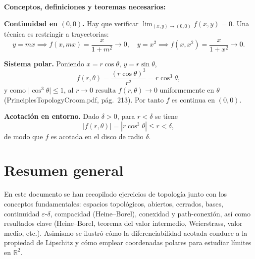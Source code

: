 \documentclass[a4paper,11pt]{article}  %
\begin{document}
\medskip
\textbf{Conceptos, definiciones y teoremas necesarios:}

\textbf{Continuidad en \((0,0)\).}  
Hay que verificar
\(\lim_{(x,y)\to(0,0)}f(x,y)=0\). Una técnica es restringir a trayectorias:
\[
y=mx\implies f(x,mx)=\frac{x}{1+m^2}\to0,\quad
y=x^2\implies f(x,x^2)=\frac{x}{1+x^2}\to0.
\]

\textbf{Sistema polar.}  
Poniendo \(x=r\cos\theta\), \(y=r\sin\theta\),
\[
f(r,\theta)
=\frac{(r\cos\theta)^3}{r^2}
=r\cos^3\theta,
\]
y como \(\lvert\cos^3\theta\rvert\le1\), al \(r\to0\) resulta \(f(r,\theta)\to0\) uniformemente en \(\theta\) (PrinciplesTopologyCroom.pdf, pág.\ 213). Por tanto \(f\) es continua en \((0,0)\).

\textbf{Acotación en entorno.}  
Dado \(\delta>0\), para \(r<\delta\) se tiene
\[
|f(r,\theta)|=|r\cos^3\theta|\le r<\delta,
\]
de modo que \(f\) es acotada en el disco de radio \(\delta\).

\bigskip

\section*{Resumen general}
En este documento se han recopilado ejercicios de topología junto con los conceptos fundamentales: espacios topológicos, abiertos, cerrados, bases, continuidad \(\varepsilon\)-\(\delta\), compacidad (Heine--Borel), conexidad y path-conexión, así como resultados clave (Heine--Borel, teorema del valor intermedio, Weierstrass, valor medio, etc.). Asimismo se ilustró cómo la diferenciabilidad acotada conduce a la propiedad de Lipschitz y cómo emplear coordenadas polares para estudiar límites en \(\mathbb{R}^2\).
\end{document}
